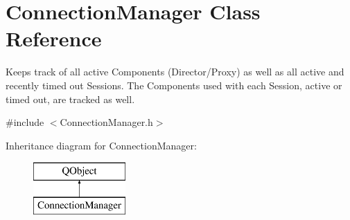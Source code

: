 \hypertarget{class_connection_manager}{\section{Connection\-Manager Class Reference}
\label{class_connection_manager}
}


Keeps track of all active Components (Director/\-Proxy) as well as all active and recently timed out Sessions. The Components used with each Session, active or timed out, are tracked as well.  




{\ttfamily \#include $<$Connection\-Manager.\-h$>$}

Inheritance diagram for Connection\-Manager\-:\begin{figure}[H]
\begin{center}
\leavevmode
\includegraphics[height=2.000000cm]{class_connection_manager}
\end{center}
\end{figure}
